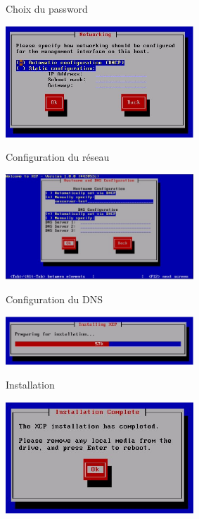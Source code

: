 \begin{center}
Choix du password
\end{center}
\begin{center}
\includegraphics[width=200pt]{images/8.png}
\end{center}
\begin{center}
Configuration du réseau
\end{center}
\begin{center}
\includegraphics[width=200pt]{images/9.png}
\end{center}
\begin{center}
Configuration du DNS
\end{center}
\begin{center}
\includegraphics[width=200pt]{images/10.png}
\end{center}
\begin{center}
Installation
\end{center}
\begin{center}
\includegraphics[width=200pt]{images/11.png}
\end{center}

